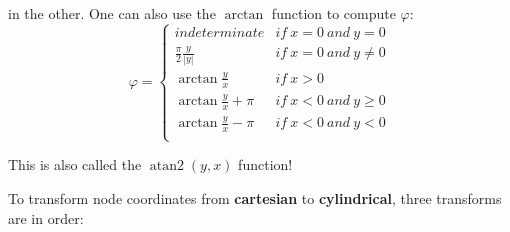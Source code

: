 \documentclass[10pt,b5paper,titlepage]{book}
\DeclareMathOperator{\atantwo}{atan2}
\begin{document}
 in the other. One can also use the $ \arctan $ function to compute $ \varphi $:
 \begin{equation}
     \varphi = \left\{ \begin{array}{cc}
             indeterminate & if\ x = 0\ and\ y = 0 \\
             \frac{\pi}{2}\frac{y}{|y|} & if\ x = 0\ and\ y \ne 0 \\
             \arctan \frac{y}{x} & if\ x > 0 \\
             \arctan \frac{y}{x} + \pi & if\ x < 0\ and\ y \ge 0 \\
             \arctan \frac{y}{x} - \pi & if\ x < 0\ and\ y < 0 \\
         \end{array} \right.
 \end{equation}

 This is also called the $ \atantwo (y, x) $ function!

 To transform node coordinates from \textbf{cartesian} to \textbf{cylindrical},
 three transforms are in order:
\end{document}
